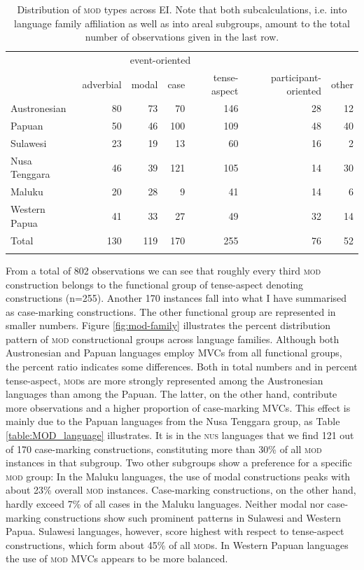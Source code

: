 \begin{table}
\begin{tabular}{lrrrr|rr}
  \lsptoprule
& \multicolumn{4}{c}{event-oriented} & & \\
 & {adverbial} & {modal} & {case} & {tense-aspect} & {participant-oriented} & {other}\\  
  \midrule
  Austronesian & 80 & 73 & 70 & 146 & 28 & 12 \tabularnewline
  Papuan & 50 & 46 & 100 & 109 & 48 & 40 \tabularnewline
   \midrule
  Sulawesi & 23 & 19 & 13 & 60 & 16 & 2 \tabularnewline
  Nusa Tenggara & 46 & 39 & 121 & 105 & 14 & 30 \tabularnewline
  Maluku & 20 & 28 & 9 & 41 & 14 & 6 \tabularnewline 
  Western Papua & 41 & 33 & 27 & 49 & 32 & 14 \tabularnewline 
\midrule
Total & 130 & 119 & 170 & 255 & 76 & 52 \tabularnewline
\lspbottomrule
\end{tabular}
\caption[Distribution of \textsc{mod} types across EI]{Distribution of \textsc{mod} types across EI. Note that both subcalculations, i.e. into language family affiliation as well as into areal subgroups,  amount to the total number of observations given in the last row.}
\label{table:MOD_overview}
\end{table}

From a total of 802 observations we can see that roughly every third \textsc{mod} construction belongs to the functional group of tense-aspect denoting constructions (n=255). Another 170 instances fall into what I have summarised as case-marking constructions. The other functional group are represented in smaller numbers. Figure \ref{fig:mod-family} illustrates the percent distribution pattern of \textsc{mod} constructional groups across language families. Although both Austronesian and Papuan languages employ MVCs from all functional groups, the percent ratio indicates some differences. Both in total numbers and in percent tense-aspect, \textsc{mod}s are more strongly represented among the Austronesian languages than among the Papuan. The latter, on the other hand, contribute more observations and a higher proportion of case-marking MVCs. This effect is mainly due to the Papuan languages from the Nusa Tenggara group, as Table \ref{table:MOD_language} illustrates. It is in the \textsc{nus} languages that we find 121 out of 170 case-marking constructions, constituting more than 30\% of all \textsc{mod} instances in that subgroup. Two other subgroups show a preference for a specific \textsc{mod} group: In the Maluku languages, the use of modal constructions peaks with about 23\% overall \textsc{mod} instances. Case-marking constructions, on the other hand, hardly exceed 7\% of all cases in the Maluku languages. Neither modal nor case-marking constructions show such prominent patterns in Sulawesi and Western Papua. Sulawesi languages, however, score highest with respect to tense-aspect constructions, which form about 45\% of all \textsc{mod}s. In Western Papuan languages the use of \textsc{mod} MVCs appears to be more balanced.

